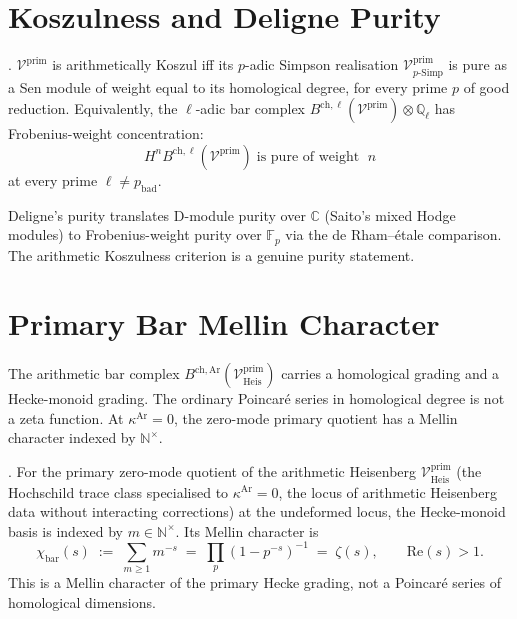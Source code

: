 \section{Koszulness and Deligne Purity}
\label{v4-arith:bar:koszulness}

\begin{theorem}
\label{v4-arith:thm:arithmetic-koszulness}
\ClaimStatusConjectured. \(\mathcal{V}^{\mathrm{prim}}\) is
arithmetically Koszul iff its \(p\)-adic Simpson realisation
\(\mathcal{V}^{\mathrm{prim}}_{p\text{-Simp}}\) is pure as a Sen
module of weight equal to its homological degree, for every prime
\(p\) of good reduction. Equivalently, the \(\ell\)-adic bar complex
\(B^{\mathrm{ch,}\ell}(\mathcal{V}^{\mathrm{prim}})\otimes\mathbb{Q}_{\ell}\)
has Frobenius-weight concentration:
\begin{equation}
H^{n}B^{\mathrm{ch,}\ell}(\mathcal{V}^{\mathrm{prim}})\;\text{is pure of weight }\;n
\end{equation}
at every prime \(\ell\neq p_{\mathrm{bad}}\).
\end{theorem}

\begin{remark}
Deligne's purity translates D-module purity over \(\mathbb{C}\)
(Saito's mixed Hodge modules) to Frobenius-weight purity over
\(\mathbb{F}_{p}\) via the de Rham--\'etale comparison. The
arithmetic Koszulness criterion is a genuine purity statement.
\end{remark}

\section{Primary Bar Mellin Character}
\label{v4-arith:bar:heisenberg-zeta}

The arithmetic bar complex
\(B^{\mathrm{ch,Ar}}(\mathcal{V}^{\mathrm{prim}}_{\mathrm{Heis}})\)
carries a homological grading and a Hecke-monoid grading. The
ordinary Poincar\'e series in homological degree is not a zeta
function. At \(\kappa^{\mathrm{Ar}}=0\), the zero-mode primary
quotient has a Mellin character indexed by \(\mathbb{N}^{\times}\).

\begin{theorem}
\label{v4-arith:thm:heisenberg-bar-zeta}
\ClaimStatusConjectured. For the primary zero-mode quotient of the arithmetic Heisenberg
\(\mathcal{V}^{\mathrm{prim}}_{\mathrm{Heis}}\) (the Hochschild
trace class specialised to \(\kappa^{\mathrm{Ar}}=0\), the locus
of arithmetic Heisenberg data without interacting corrections) at
the undeformed locus, the Hecke-monoid basis is indexed by
\(m\in\mathbb{N}^{\times}\). Its Mellin character is
\begin{equation}
\chi_{\mathrm{bar}}(s)
\;:=\;\sum_{m\geq 1}m^{-s}
\;=\;\prod_{p}(1-p^{-s})^{-1}
\;=\;\zeta(s),\qquad \mathrm{Re}(s)>1.
\end{equation}
This is a Mellin character of the primary Hecke grading, not a
Poincar\'e series of homological dimensions.
\end{theorem}

